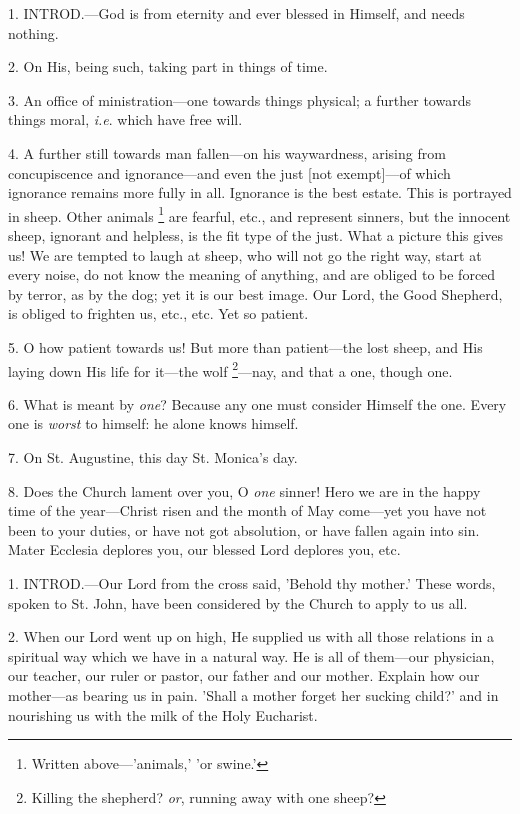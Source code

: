 
1. INTROD.—God
is from eternity and ever blessed in Himself, and needs nothing.

2. On His, being such, taking part in things of
time.

3. An office of ministration—one towards things
physical; a further towards things moral, \emph{i.e}. which have free
will.

4. A further still towards man fallen—on his
waywardness, arising from concupiscence and ignorance—and even the
just [not exempt]—of which ignorance remains more fully in all.
Ignorance is the best estate. This is portrayed in sheep. Other
animals \footnote{Written above—'animals,'
'or swine.'} are fearful,
etc., and represent sinners, but the innocent sheep, ignorant and
helpless, is the fit type of the just. What a picture this gives
us! We are tempted to laugh at sheep, who will not go the right way,
start at every noise, do not know the meaning of anything, and are
obliged to be forced by terror, as by the dog; yet it is our best
image. Our Lord, the Good Shepherd, is obliged to frighten us, etc.,
etc. Yet so patient.

5. O how patient towards us! But more than
patient—the lost sheep, and His laying down His life for it—the
wolf \footnote{Killing the shepherd? \emph{or},
running away with one sheep?}—nay, and that a
one, though one.

6. What is meant by \emph{one}? Because any one
must consider Himself the one. Every one is \emph{worst} to himself:
he alone knows himself.

7. On St. Augustine, this day St. Monica's day.

8. Does the Church lament over you, O \emph{one}
sinner! Hero we are in the happy time of the year—Christ risen and
the month of May come—yet you have not been to your duties, or have
not got absolution, or have fallen again into sin. Mater Ecclesia
deplores you, our blessed Lord deplores you, etc.


1. INTROD.—Our
Lord from the cross said, 'Behold thy mother.' These words, spoken to
St. John, have been considered by the Church to apply to us all.

2. When our Lord went up on high, He supplied us
with all those relations in a spiritual way which we have in a natural
way. He is all of them—our physician, our teacher, our ruler or
pastor, our father and our mother. Explain how our mother—as bearing
us in pain. 'Shall a mother forget her sucking child?' and in
nourishing us with the milk of the Holy Eucharist.

